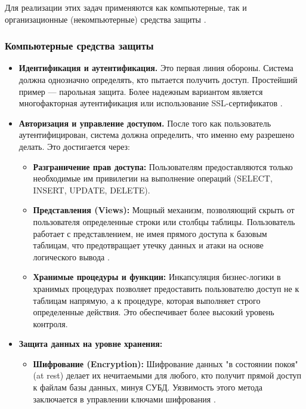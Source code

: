 Для реализации этих задач применяются как компьютерные, так и организационные (некомпьютерные) средства защиты \autocite[сс. 12-14]{Skakun}.

\subsubsection{Компьютерные средства защиты}
\begin{itemize}
	\item \textbf{Идентификация и аутентификация.} Это первая линия обороны. Система должна однозначно определять, кто пытается получить доступ. Простейший пример — парольная защита. Более надежным вариантом является многофакторная аутентификация или использование SSL-сертификатов \autocite{MicrosoftLearnSQLserverPerm}.

	\item \textbf{Авторизация и управление доступом.} После того как пользователь аутентифицирован, система должна определить, что именно ему разрешено делать. Это достигается через:
	\begin{itemize}
		\item \textbf{Разграничение прав доступа:} Пользователям предоставляются только необходимые им привилегии на выполнение операций (SELECT, INSERT, UPDATE, DELETE).
		\item \textbf{Представления (Views):} Мощный механизм, позволяющий скрыть от пользователя определенные строки или столбцы таблицы. Пользователь работает с представлением, не имея прямого доступа к базовым таблицам, что предотвращает утечку данных и атаки на основе логического вывода \autocite[с. 12]{Skakun}.
		\item \textbf{Хранимые процедуры и функции:} Инкапсуляция бизнес-логики в хранимых процедурах позволяет предоставить пользователю доступ не к таблицам напрямую, а к процедуре, которая выполняет строго определенные действия. Это обеспечивает более высокий уровень контроля.
	\end{itemize}

	\item \textbf{Защита данных на уровне хранения:}
	\begin{itemize}
		\item \textbf{Шифрование (Encryption):} Шифрование данных "в состоянии покоя" (at rest) делает их нечитаемыми для любого, кто получит прямой доступ к файлам базы данных, минуя СУБД. Уязвимость этого метода заключается в управлении ключами шифрования \autocite{oracledbdoc3}.
	\end{itemize}
	

\end{itemize}
